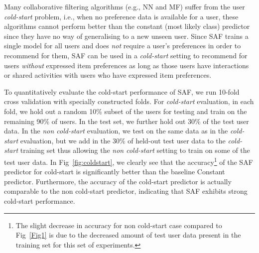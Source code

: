 
Many collaborative filtering algorithms (e.g., NN and MF) suffer from
the user \emph{cold-start} problem, i.e., when no preference data is
available for a user, these algorithms cannot perform better than the
constant (most likely class) predictor since they have no way of
generalising to a new unseen user.  Since SAF trains a single model
for all users and does \emph{not} require a user's preferences in
order to recommend for them, SAF can be used in a \emph{cold-start}
setting to recommend for users \emph{without} expressed item
preferences as long as those users have interactions or shared
activities with users who have expressed item preferences.

To quantitatively evaluate the cold-start performance of SAF, we run
10-fold cross validation with specially constructed folds.
For \textit{cold-start} evaluation, in each fold, we hold out a random
10\% subset of the users for testing and train on the remaining 90\%
of users.  In the test set, we further hold out 30\% of the test user
data.  In the \textit{non cold-start} evaluation, we test on the same
data as in the \textit{cold-start} evaluation, but we add in the 30\%
of held-out test user data to the \textit{cold-start} training set
thus allowing the \textit{non cold-start} setting to train on some of
the test user data.  In Fig~\ref{fig:coldstart}, we clearly see that
the accuracy\footnote{The slight decrease in accuracy for non
cold-start case compared to Fig~\ref{Fig1} is due to the decreased
amount of test user data present in the training set for this set of
experiments.}  of the SAF predictor for cold-start is significantly
better than the baseline Constant predictor.  Furthermore, the
accuracy of the cold-start predictor is actually comparable to the non
cold-start predictor, indicating that SAF exhibits strong
cold-start performance.



